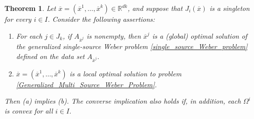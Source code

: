 \documentclass[10pt,a4paper]{amsart}
\newtheorem{theorem}{Theorem}
\begin{document}
\begin{theorem} \label{L.O.Solution_3}
	Let $\overline{x}=(\overline{x}^1,\dots,\overline{x}^k)\in \mathbb{R}^{dk}$, and suppose that $J_i(\overline{x})$ is a singleton for every $i \in I$. Consider the following assertions:
	
	\begin{enumerate}
		\item[\rm {(a)}] For each $j \in J_k$, if $A_{\overline{x}^j}$ is nonempty, then $\overline{x}^j$ is a (global) optimal solution of the generalized single-source Weber problem \eqref{single_source_Weber_problem} defined on the data set $A_{\overline{x}^j}$.
		\item[\rm{(b)}] $\overline{x}=(\overline{x}^1,\dots,\overline{x}^k)$ is a local optimal solution to problem \eqref{Generalized_Multi_Source_Weber_Problem}.
	\end{enumerate}
	
	Then (a) implies (b). The converse implication also holds if, in addition, each $\Omega^i$ is convex for all $i \in I$.
	
\end{theorem}
\end{document}

